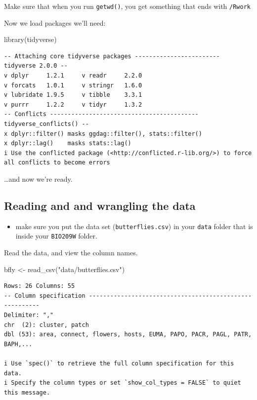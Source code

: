 \documentclass[
  letterpaper,
  DIV=11,
  numbers=noendperiod]{scrreprt}
\newenvironment{Shaded}{\begin{snugshade}}{\end{snugshade}}
\newcommand{\FunctionTok}[1]{\textcolor[rgb]{0.28,0.35,0.67}{#1}}
\newcommand{\NormalTok}[1]{\textcolor[rgb]{0.00,0.23,0.31}{#1}}
\newcommand{\OtherTok}[1]{\textcolor[rgb]{0.00,0.23,0.31}{#1}}
\newcommand{\StringTok}[1]{\textcolor[rgb]{0.13,0.47,0.30}{#1}}
\providecommand{\tightlist}{%
  \setlength{\itemsep}{0pt}\setlength{\parskip}{0pt}}
\begin{document}
Make sure that when you run \texttt{getwd()}, you get something that
ends with \texttt{/Rwork}

Now we load packages we'll need:

\begin{Shaded}
\begin{Highlighting}[]
\FunctionTok{library}\NormalTok{(tidyverse)}
\end{Highlighting}
\end{Shaded}

\begin{verbatim}
-- Attaching core tidyverse packages ------------------------ tidyverse 2.0.0 --
v dplyr     1.2.1     v readr     2.2.0
v forcats   1.0.1     v stringr   1.6.0
v lubridate 1.9.5     v tibble    3.3.1
v purrr     1.2.2     v tidyr     1.3.2
-- Conflicts ------------------------------------------ tidyverse_conflicts() --
x dplyr::filter() masks ggdag::filter(), stats::filter()
x dplyr::lag()    masks stats::lag()
i Use the conflicted package (<http://conflicted.r-lib.org/>) to force all conflicts to become errors
\end{verbatim}

\ldots and now we're ready.

\subsection{Reading and and wrangling the
data}\label{reading-and-and-wrangling-the-data}

\begin{itemize}
\tightlist
\item
  make sure you put the data set (\texttt{butterflies.csv}) in your
  \texttt{data} folder that is inside your \texttt{BIO209W} folder.
\end{itemize}

Read the data, and view the column names.

\begin{Shaded}
\begin{Highlighting}[]
\NormalTok{bfly }\OtherTok{\textless{}{-}} \FunctionTok{read\_csv}\NormalTok{(}\StringTok{"data/butterflies.csv"}\NormalTok{)}
\end{Highlighting}
\end{Shaded}

\begin{verbatim}
Rows: 26 Columns: 55
-- Column specification --------------------------------------------------------
Delimiter: ","
chr  (2): cluster, patch
dbl (53): area, connect, flowers, hosts, EUMA, PAPO, PACR, PAGL, PATR, BAPH,...

i Use `spec()` to retrieve the full column specification for this data.
i Specify the column types or set `show_col_types = FALSE` to quiet this message.
\end{verbatim}
\end{document}

